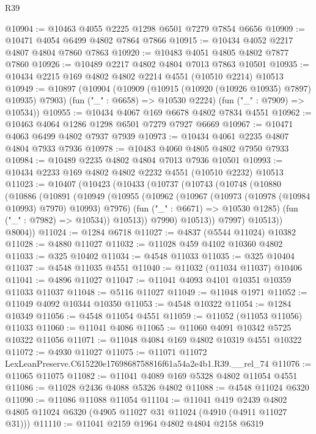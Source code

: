 \begin{lexlean}{R39}
\begin{coremodule}
@10904 := @10463 @4055 @2225 @1298 @6501 @7279 @7854 @6656
@10909 := @10471 @4054 @6499 @4802 @7864 @7866
@10915 := @10434 @4052 @2217 @4807 @4804 @7860 @7863
@10920 := @10483 @4051 @4805 @4802 @7877 @7860
@10926 := @10489 @2217 @4802 @4804 @7013 @7863 @10501
@10935 := @10434 @2215 @169 @4802 @4802 @2214 @4551 (@10510 @2214) @10513
@10949 := @10897
    (@10904
      (@10909 (@10915 (@10920 (@10926 @10935) @7897) @10935) @7903)
      (fun ("_" : @6658) => @10530 @2224)
      (fun ("_" : @7909) => @10534))
@10955 := @10434 @4067 @169 @6678 @4802 @7834 @4551
@10962 := @10463 @4064 @1286 @1298 @6501 @7279 @7927 @6669
@10967 := @10471 @4063 @6499 @4802 @7937 @7939
@10973 := @10434 @4061 @2235 @4807 @4804 @7933 @7936
@10978 := @10483 @4060 @4805 @4802 @7950 @7933
@10984 := @10489 @2235 @4802 @4804 @7013 @7936 @10501
@10993 := @10434 @2233 @169 @4802 @4802 @2232 @4551 (@10510 @2232) @10513
@11023 := @10407
    (@10423
      (@10433
        (@10737
          (@10743
            (@10748
              (@10880
                (@10886
                  (@10891
                    (@10949
                      (@10955
                        (@10962
                          (@10967 (@10973 (@10978 (@10984 @10993) @7970) @10993) @7976)
                          (fun ("_" : @6671) => @10530 @1285)
                          (fun ("_" : @7982) => @10534))
                        @10513))
                    @7990)
                  @10513))
              @7997)
            @10513))
        @8004))
@11024 := @1284 @6718
@11027 := @4837 (@5544 @11024) @10382
@11028 := @4880 @11027
@11032 := @11028 @459 @4102 @10360 @4802
@11033 := @325 @10402
@11034 := @4548 @11033
@11035 := @325 @10404
@11037 := @4548 @11035 @4551
@11040 := @11032 (@11034 @11037) @10406
@11041 := @4896 @11027
@11047 := @11041 @4093 @4101 @10351 @10359 @11033 @11037
@11048 := @5116 @11027
@11049 := @11048 @1971
@11052 := @11049 @4092 @10344 @10350
@11053 := @4548 @10322
@11054 := @1284 @10349
@11056 := @4548 @11054 @4551
@11059 := @11052 (@11053 @11056) @11033
@11060 := @11041 @4086
@11065 := @11060 @4091 @10342 @5725 @10322 @11056
@11071 := @11048 @4084 @169 @4802 @10319 @4551 @10322
@11072 := @4930 @11027
@11075 := @11071 @11072 LexLeanPreserve.C615220e1769868758816f61a54a2e4b1.R39.__rel_74
@11076 := @11065 @11075
@11082 := @11041 @4089 @169 @5328 @4802 @11054 @4551
@11086 := @11028 @2436 @4088 @5326 @4802
@11088 := @4548 @11024 @6320
@11090 := @11086 @11088 @11054
@11104 := @11041
    @419
    @2439
    @4802
    @4805
    @11024
    @6320
    (@4905 @11027 @31 @11024 (@4910 (@4911 @11027 @31)))
@11110 := @11041 @2159 @1964 @4802 @4804 @2158 @6319

\end{coremodule}
\end{lexlean}
